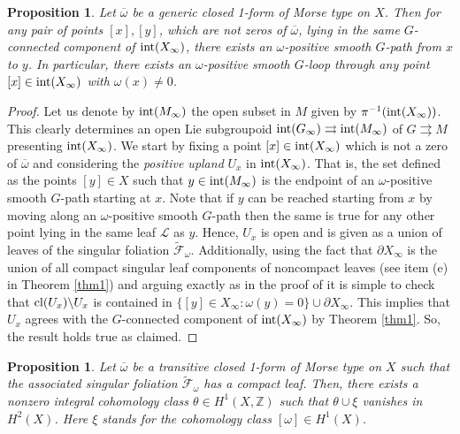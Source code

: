 \documentclass[
  a4paper, 
  reqno, 
  oneside, 
  12pt
]{amsart}
\newtheorem{proposition}[theorem]{Proposition}
\theoremstyle{definition}
\theoremstyle{remark}
\newcommand{\rr}{\rightrightarrows}
\begin{document}
\begin{proposition}\label{pro:Harmonic1}
Let $\overline{\omega}$ be a generic closed 1-form of Morse type on $X$. Then for any pair of points $[x], [y]$, which are not zeros of $\overline{\omega}$, lying in the same $G$-connected component of $\textnormal{int}(X_\infty)$, there exists an $\omega$-positive smooth $G$-path from $x$ to $y$. In particular, there exists an $\omega$-positive smooth $G$-loop through any point $[x]\in \textnormal{int}(X_\infty)$ with $\omega(x)\neq 0$. 
\end{proposition}
\begin{proof}
Let us denote by $\textnormal{int}(M_\infty)$ the open subset in $M$ given by $\pi^{-1}(\textnormal{int}(X_\infty))$. This clearly determines an open Lie subgroupoid $\textnormal{int}(G_\infty)\rr \textnormal{int}(M_\infty)$ of $G\rr M$ presenting $\textnormal{int}(X_\infty)$. We start by fixing a point $[x]\in \textnormal{int}(X_\infty)$ which is not a zero of $\overline{\omega}$ and considering the \emph{positive upland} $U_x$ in  $\textnormal{int}(X_\infty)$. That is, the set defined as the points $[y]\in X$ such that $y\in \textnormal{int}(M_\infty)$ is the endpoint of an $\omega$-positive smooth $G$-path starting at $x$. Note that if $y$ can be reached starting from $x$ by moving along an $\omega$-positive smooth $G$-path then the same is true for any other point lying in the same leaf $\mathcal{L}$ as $y$. Hence, $U_x$ is open and is given as a union of leaves of the singular foliation $\tilde{\mathcal{F}}_\omega$. Additionally, using the fact that $\partial X_\infty$ is the union of all compact singular leaf components of noncompact leaves (see item (e) in Theorem \ref{thm1}) and arguing exactly as in the proof of \cite[Thm. 9.13]{F} it is simple to check that $\textnormal{cl}(U_x)\backslash  U_x$ is contained in $\lbrace [y]\in X_\infty: \omega(y)=0\rbrace\cup \partial X_\infty$. This implies that $U_x$ agrees with the $G$-connected component of $\textnormal{int}(X_\infty)$ by Theorem \ref{thm1}. So, the result holds true as claimed. 
\end{proof}

\begin{proposition}\label{pro1}
Let $\overline{\omega}$ be a transitive closed 1-form of Morse type on $X$ such that the associated singular foliation $\tilde{\mathcal{F}}_\omega$ has a compact leaf. Then, there exists a nonzero integral cohomology class $\theta\in H^1(X,\mathbb{Z})$ such that $\theta \cup \xi$ vanishes in $H^2(X)$. Here $\xi$ stands for the cohomology class $[\omega]\in H^1(X)$.
\end{proposition}
\end{document}
